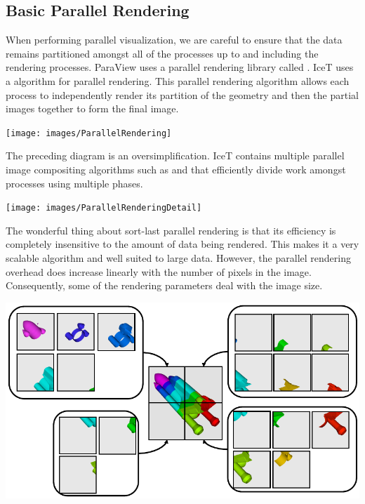 \subsection{Basic Parallel Rendering}

When performing parallel visualization, we are careful to ensure that the
data remains partitioned amongst all of the processes up to and including
the rendering processes.  ParaView uses a parallel rendering library called
.  IceT uses a  algorithm for parallel
rendering.  This parallel rendering algorithm allows each process to
independently render its partition of the geometry and then
 the partial images together to form the final image.

\begin{inlinefig}
  \texttt{[image: images/ParallelRendering]}
\end{inlinefig}

The preceding diagram is an oversimplification.  IceT contains multiple
parallel image compositing algorithms such as  and
 that efficiently divide work amongst processes using
multiple phases.

\begin{inlinefig}
  \texttt{[image: images/ParallelRenderingDetail]}
\end{inlinefig}

The wonderful thing about sort-last parallel rendering is that its
efficiency is completely insensitive to the amount of data being rendered.
This makes it a very scalable algorithm and well suited to large data.
However, the parallel rendering overhead does increase linearly with the
number of pixels in the image.  Consequently, some of the rendering
parameters deal with the image size.

\begin{inlinefig}
  \includegraphics{images/ParallelRenderingTiles}
\end{inlinefig}

